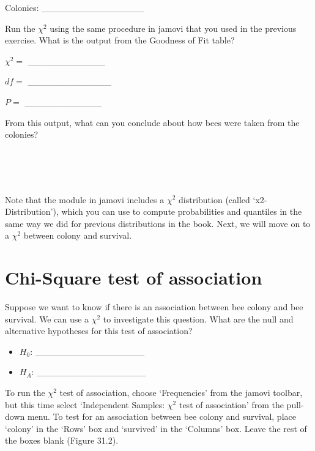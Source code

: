 \documentclass[
  openany]{krantz}
\begin{document}
Colonies: \_\_\_\_\_\_\_\_\_\_\_\_\_\_\_\_

Run the \(\chi^{2}\)  using the same procedure in jamovi that you used in the previous exercise.
What is the output from the Goodness of Fit table?

\(\chi^{2} =\) \_\_\_\_\_\_\_\_\_\_\_\_

\(df =\) \_\_\_\_\_\_\_\_\_\_\_\_\_

\(P =\) \_\_\_\_\_\_\_\_\_\_\_\_

From this output, what can you conclude about how bees were taken from the colonies?

\begin{verbatim}




\end{verbatim}

Note that the  module in jamovi includes a \(\chi^{2}\) distribution (called `x2-Distribution'), which you can use to compute probabilities and quantiles in the same way we did for previous distributions in the book.
Next, we will move on to a \(\chi^{2}\)  between colony and survival.

\hypertarget{chi-square-test-of-association-1}{%
\section{Chi-Square test of association}\label{chi-square-test-of-association-1}}

Suppose we want to know if there is an association between bee colony and bee survival.
We can use a \(\chi^{2}\)  to investigate this question.
What are the null and alternative hypotheses for this test of association?

\begin{itemize}
\item
  \(H_{0}\): \_\_\_\_\_\_\_\_\_\_\_\_\_\_\_\_\_
\item
  \(H_{A}\): \_\_\_\_\_\_\_\_\_\_\_\_\_\_\_\_\_
\end{itemize}

To run the \(\chi^{2}\) test of association, choose `Frequencies' from the jamovi toolbar, but this time select `Independent Samples: \(\chi^{2}\) test of association' from the pull-down menu.
To test for an association between bee colony and survival, place `colony' in the `Rows' box and `survived' in the `Columns' box.
Leave the rest of the boxes blank (Figure 31.2).
\end{document}
